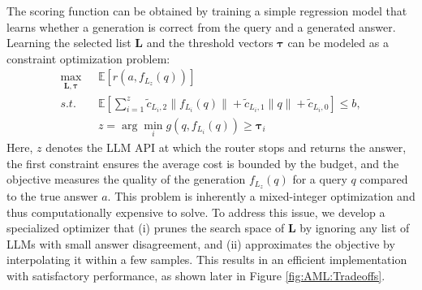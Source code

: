 \documentclass{article}
\newcommand{\eat}[1]{}
\newcommand{\E}{\mathbb{E}}
\numberwithin{equation}{section}
\newcommand{\query}{q}
\newcommand{\answer}{a}
\begin{document}
The scoring function can be obtained by training a simple regression model that learns whether a generation is correct from the query and a generated answer. Learning the selected list $\pmb L$ and the threshold vectors $\pmb \tau$ can be modeled as a constraint optimization problem:
\begin{equation*}
    \begin{split}
        \max_{\pmb L, \pmb \tau}  \textit{ }& \E\left[r(a,f_{L_z}(q))\right]\\
    s.t. \textit{ }& \E\left[\sum_{i=1}^{z} \tilde{c}_{L_i,2} \|f_{L_i}(\query)\|+\tilde{c}_{L_i,1} \|\query\|+ \tilde{c}_{L_i,0}\right]\leq b,    \\
    & z = \arg\min_i g(q,f_{L_i}(q)) \geq  \pmb \tau_i
    \end{split}
\end{equation*}
Here, $z$ denotes the LLM API at which the router stops and returns the answer, the first constraint ensures the average cost is bounded by the budget, and the objective measures the quality of the generation $f_{L_z}(q)$ for a query $\query$ compared to the true answer $\answer$. This problem is inherently a mixed-integer optimization and thus computationally expensive to solve. To address this issue, we develop a specialized optimizer that (i) prunes the search space of $\pmb L$ by ignoring any list of LLMs with small answer disagreement, and (ii) approximates the objective by interpolating it within a few samples. This results in an efficient implementation with satisfactory performance, as  shown later in Figure \ref{fig:AML:Tradeoffs}.



\eat{Many LLM queries aim at picking one of many options. 
For example, information retrieval queries need an LLM API to select one from many documents that best answers a given question.
One popular approach~\cite{liang2022holistic} is to send the question and each possible document to the LLM API, and select the document on which an LLM API favors the most, but this is costly to process plenty of documents.
 \textit{Option pruning} helps mitigate this cost.
 As shown in Figure \ref{fig:AML:Examples} (f), the key idea is to use cheap LLMs to filter out documents that are highly likely to be irrelative, and then only use the expensive LLM to process a few options. As long as the cheap LLM APIs keep the correct option in the filtered documents,  the performance will be at least as good as using the expensive API for all documents. 
}
\end{document}
